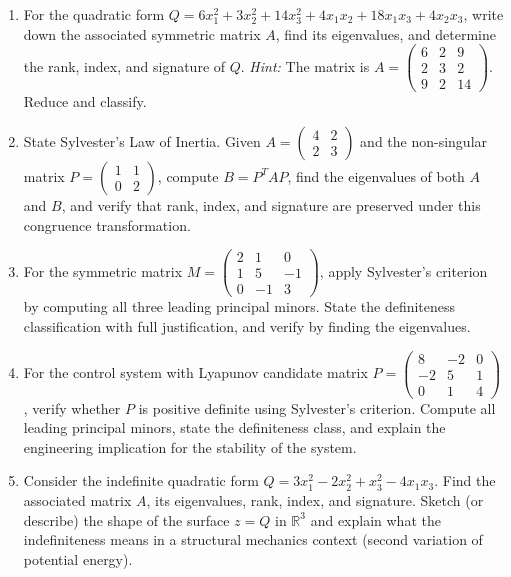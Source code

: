 \documentclass[12pt,a4paper]{article}
\begin{document}
\begin{enumerate}[label=\textbf{D\arabic*.}, leftmargin=*]
  \item For the quadratic form
        \(Q = 6x_1^2 + 3x_2^2 + 14x_3^2 + 4x_1 x_2 + 18x_1 x_3 + 4x_2 x_3\),
        write down the associated symmetric matrix \(A\), find its eigenvalues,
        and determine the rank, index, and signature of \(Q\).
        \textit{Hint:} The matrix is
        \(A = \begin{pmatrix} 6 & 2 & 9 \\ 2 & 3 & 2 \\ 9 & 2 & 14 \end{pmatrix}\).
        Reduce and classify.

  \item State Sylvester's Law of Inertia. Given
        \(A = \begin{pmatrix} 4 & 2 \\ 2 & 3 \end{pmatrix}\) and the non-singular matrix
        \(P = \begin{pmatrix} 1 & 1 \\ 0 & 2 \end{pmatrix}\), compute \(B = P^T A P\),
        find the eigenvalues of both \(A\) and \(B\), and verify that rank, index, and
        signature are preserved under this congruence transformation.

  \item For the symmetric matrix
        \(M = \begin{pmatrix} 2 & 1 & 0 \\ 1 & 5 & -1 \\ 0 & -1 & 3 \end{pmatrix}\),
        apply Sylvester's criterion by computing all three leading principal minors.
        State the definiteness classification with full justification, and verify by
        finding the eigenvalues.

  \item For the control system with Lyapunov candidate matrix
        \(P = \begin{pmatrix} 8 & -2 & 0 \\ -2 & 5 & 1 \\ 0 & 1 & 4 \end{pmatrix}\),
        verify whether \(P\) is positive definite using Sylvester's criterion.
        Compute all leading principal minors, state the definiteness class, and explain
        the engineering implication for the stability of the system.

  \item Consider the indefinite quadratic form
        \(Q = 3x_1^2 - 2x_2^2 + x_3^2 - 4x_1 x_3\).
        Find the associated matrix \(A\), its eigenvalues, rank, index, and signature.
        Sketch (or describe) the shape of the surface \(z = Q\) in \(\mathbb{R}^3\) and
        explain what the indefiniteness means in a structural mechanics context (second
        variation of potential energy).
\end{enumerate}
\end{document}
